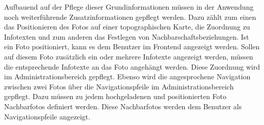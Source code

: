 Aufbauend auf der Pflege dieser Grundinformationen müssen in der Anwendung noch
weiterführende Zusatzinformationen gepflegt werden. Dazu zählt zum einen das
Positionieren des Fotos auf einer topographischen Karte, die Zuordnung zu
Infotexten und zum anderen das Festlegen von Nachbarschaftsbeziehungen. Ist ein Foto
positioniert, kann es dem Benutzer im Frontend angezeigt werden. 
Sollen auf diesem Foto zusätzlich ein oder mehrere Infotexte angezeigt werden,
müssen die entsprechende Infotexte an das Foto angehängt werden. Diese Zuordnung
wird im Administrationsbereich gepflegt. Ebenso wird die angesprochene
Navigation zwischen zwei Fotos über die Navigationspfeile im
Administrationsbereich gepflegt. Dazu müssen zu jedem hochgeladenen und
positionierten Foto Nachbarfotos definiert werden. Diese Nachbarfotos werden dem
Benutzer als Navigationspfeile angezeigt.

